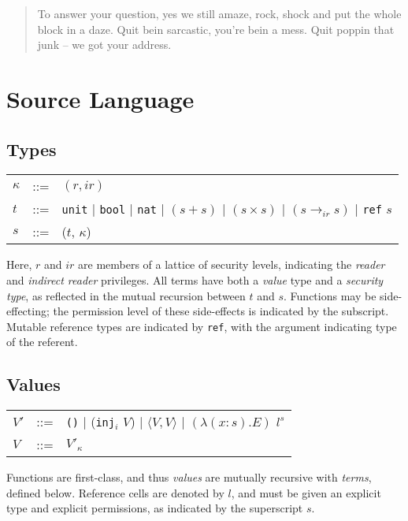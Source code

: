 \documentclass{article}
\title{}
\author{Benjamin Schulz}
\begin{document}
\begin{abstract}

To answer your question, yes we still amaze, rock, shock and put the whole
block in a daze.  Quit bein sarcastic, you're bein a mess.  Quit poppin that
junk -- we got your address.

\end{abstract}

\section{Source Language}

\subsection{Types}
\begin{tabular}[t]{lll}

 $\kappa$ &::=& $(r, ir)$\\
 $t$ &::=& \texttt{unit} $\vert$ \texttt{bool} $\vert$ \texttt{nat} $\vert$
           $(s + s)$ $\vert$
           $(s \times s)$ $\vert$ $(s \rightarrow_{ir} s)$
           $\vert$ \texttt{ref} $s$\\
 $s$ &::=& ($t$, $\kappa$)\\
\end{tabular}

Here, $r$ and $ir$ are members of a lattice of security levels, indicating
the \emph{reader} and \emph{indirect reader} privileges.  All terms have
both a \emph{value} type and a \emph{security type}, as reflected in the
mutual recursion between $t$ and $s$.  Functions may be side-effecting; the
permission level of these side-effects is indicated by the subscript. Mutable
reference types are indicated by \texttt{ref}, with the argument indicating
type of the referent.

\subsection{Values}


\begin{tabular}[t]{lll}
 $V\prime$ &::=& \texttt{()} $\vert$ (\texttt{inj}$_i$ $V$) $\vert$
                 $\langle V , V \rangle$
                 $\vert$ $(\lambda (x : s) . E)$
                 $l^s$\\
 $V$ &::=& $V\prime_\kappa$\\
\end{tabular}

Functions are first-class, and thus \emph{values} are mutually recursive with
\emph{terms}, defined below.  Reference cells are denoted by $l$, and must
be given an explicit type and explicit permissions, as indicated by the
superscript $s$.
\end{document}
